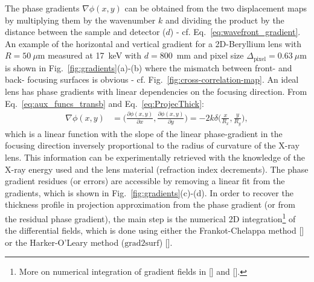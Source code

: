 \begin{refsection}
The phase gradients $\nabla\phi(x,y)$ can be obtained from the two displacement maps by multiplying them by the wavenumber $k$ and dividing the product by the distance between the sample and detector ($d$) - cf. Eq.~\ref{eq:wavefront_gradient}. An example of the horizontal and vertical gradient for a 2D-Beryllium lens with $R=50~\mu$m measured at 17~keV with $d=800$~mm and pixel size $\Delta_\text{pixel}= 0.63~\mu$m is shown in Fig.~\ref{fig:gradients}(a)-(b) where the mismatch between front- and back- focusing surfaces is obvious - cf. Fig.~\ref{fig:cross-correlation-map}. An ideal lens has phase gradients with linear dependencies on the focusing direction. From Eq.~\ref{eq:aux_funcs_transb} and Eq.~\ref{eq:ProjecThick}: 
\begin{align}
    \nabla\phi(x,y) & = \Bigg(\frac{\partial \phi(x,y)}{\partial x},\frac{\partial \phi(x,y)}{\partial y}  \Bigg) = -2k\delta\Bigg(\frac{x}{R_x},\frac{y}{R_y}\Bigg),
\end{align}{}
which is a linear function with the slope of the linear phase-gradient in the focusing direction inversely proportional to the radius of curvature of the X-ray lens. This information  can be experimentally retrieved with the knowledge of the X-ray energy used and the lens material (refraction index decrements). The phase gradient residues (or errors) are accessible by removing a linear fit from the gradients, which is shown in Fig.~\ref{fig:gradients}(c)-(d). In order to recover the thickness profile in projection approximation from the phase gradient (or from the residual phase gradient), the main step is the numerical 2D integration\footnote{More on numerical integration of gradient fields in [\cite{Huang2015}] and [\cite{Agrawal2006}].} of the differential fields, which is done using either the Frankot-Chelappa method [\cite{Frankot1988}] or the Harker-O'Leary method ($\text{grad2surf}$) [\cite{Harker2015}]. 


\end{refsection}
